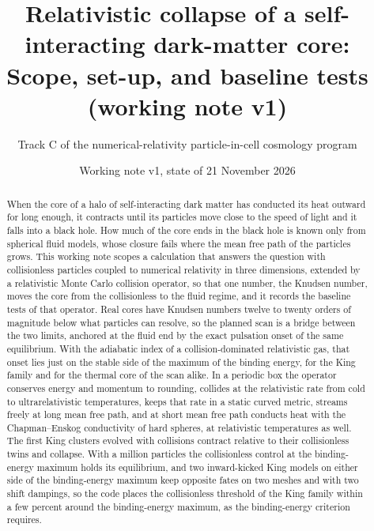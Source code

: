 \documentclass[aps,prd,twocolumn,10pt,superscriptaddress,nofootinbib,longbibliography,floatfix]{revtex4-2}
\begin{document}
\title{Relativistic collapse of a self-interacting dark-matter core:\\ Scope, set-up, and baseline tests (working note v1)}

\author{Track C of the numerical-relativity particle-in-cell cosmology program}

\date{Working note v1, state of 21 November 2026}

\begin{abstract}
When the core of a halo of self-interacting dark matter has conducted its heat outward for long enough, it contracts until its particles move close to the speed of light and it falls into a black hole. How much of the core ends in the black hole is known only from spherical fluid models, whose closure fails where the mean free path of the particles grows. This working note scopes a calculation that answers the question with collisionless particles coupled to numerical relativity in three dimensions, extended by a relativistic Monte Carlo collision operator, so that one number, the Knudsen number, moves the core from the collisionless to the fluid regime, and it records the baseline tests of that operator. Real cores have Knudsen numbers twelve to twenty orders of magnitude below what particles can resolve, so the planned scan is a bridge between the two limits, anchored at the fluid end by the exact pulsation onset of the same equilibrium. With the adiabatic index of a collision-dominated relativistic gas, that onset lies just on the stable side of the maximum of the binding energy, for the King family and for the thermal core of the scan alike. In a periodic box the operator conserves energy and momentum to rounding, collides at the relativistic rate from cold to ultrarelativistic temperatures, keeps that rate in a static curved metric, streams freely at long mean free path, and at short mean free path conducts heat with the Chapman--Enskog conductivity of hard spheres, at relativistic temperatures as well. The first King clusters evolved with collisions contract relative to their collisionless twins and collapse. With a million particles the collisionless control at the binding-energy maximum holds its equilibrium, and two inward-kicked King models on either side of the binding-energy maximum keep opposite fates on two meshes and with two shift dampings, so the code places the collisionless threshold of the King family within a few percent around the binding-energy maximum, as the binding-energy criterion requires.
\end{abstract}
\end{document}
